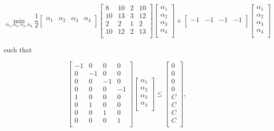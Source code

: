\documentclass[10pt]{article}
\begin{document}
\[
\min_{\alpha_1, \alpha_2, \alpha_3, \alpha_4}
\frac{1}{2}
\begin{bmatrix}
    \alpha_1 & \alpha_2 & \alpha_3 & \alpha_4 \\
\end{bmatrix}
\begin{bmatrix}
    8       & 10 & 2 & 10 \\
    10     & 13 & 3 & 12 \\
    2       & 2  & 1  & 2 \\
  10       & 12 & 2 & 13 \\
\end{bmatrix}
\begin{bmatrix}
    \alpha_1 \\
    \alpha_2 \\
    \alpha_3 \\
    \alpha_4 \\
\end{bmatrix} 
+
\begin{bmatrix}
    -1       & -1 & -1 & -1 \\
\end{bmatrix}
\begin{bmatrix}
    \alpha_1 \\
    \alpha_2 \\
    \alpha_3 \\
    \alpha_4 \\
\end{bmatrix} 
\]

\begin{center}
such that
\end{center}

\[
\begin{bmatrix}
    -1 & 0 & 0 & 0 \\
    0 & -1 & 0 & 0 \\
    0 & 0 & -1 & 0 \\
    0 & 0 & 0 & -1 \\
    1 & 0 & 0 &0 \\
    0 & 1 & 0 & 0 \\
    0 & 0 & 1 & 0 \\
    0 & 0 & 0 & 1 \\
\end{bmatrix}
\begin{bmatrix}
    \alpha_1 \\
    \alpha_2 \\
    \alpha_3 \\
    \alpha_4 \\
\end{bmatrix} 
\leq
\begin{bmatrix}
0 \\
0 \\ 
0 \\ 
0 \\ 
C \\
C \\ 
C \\ 
C \\
\end{bmatrix},
\]
\end{document}
